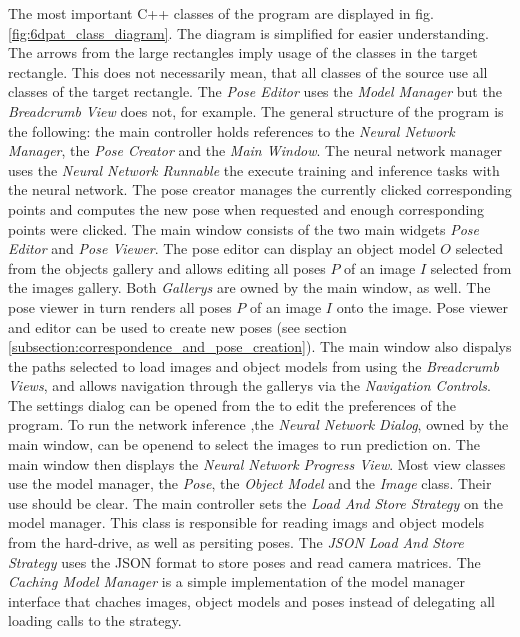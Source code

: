 The most important C++ classes of the program are displayed in fig. \ref{fig:6dpat_class_diagram}. The diagram is simplified for easier understanding. The arrows from the large rectangles imply usage of the classes in the target rectangle. This does not necessarily mean, that all classes of the source use all classes of the target rectangle. The \textit{Pose Editor} uses the \textit{Model Manager} but the \textit{Breadcrumb View} does not, for example. The general structure of the program is the following: the main controller holds references to the \textit{Neural Network Manager}, the \textit{Pose Creator} and the \textit{Main Window}. The neural network manager uses the \textit{Neural Network Runnable} the execute training and inference tasks with the neural network. The pose creator manages the currently clicked corresponding points and computes the new pose when requested and enough corresponding points were clicked. The main window consists of the two main widgets \textit{Pose Editor} and \textit{Pose Viewer}. The pose editor can display an object model $O$ selected from the objects gallery and allows editing all poses $P$ of an image $I$ selected from the images gallery. Both \textit{Gallerys} are owned by the main window, as well. The pose viewer in turn renders all poses $P$ of an image $I$ onto the image. Pose viewer and editor can be used to create new poses (see section \ref{subsection:correspondence_and_pose_creation}). The main window also dispalys the paths selected to load images and object models from using the \textit{Breadcrumb Views}, and allows navigation through the gallerys via the \textit{Navigation Controls}. The settings dialog can be opened from the to edit the preferences of the program. To run the network inference ,the \textit{Neural Network Dialog}, owned by the main window, can be openend to select the images to run prediction on. The main window then displays the \textit{Neural Network Progress View}. Most view classes use the model manager, the \textit{Pose}, the \textit{Object Model} and the \textit{Image} class. Their use should be clear. The main controller sets the \textit{Load And Store Strategy} on the model manager. This class is responsible for reading imags and object models from the hard-drive, as well as persiting poses. The \textit{JSON Load And Store Strategy} uses the JSON format to store poses and read camera matrices. The \textit{Caching Model Manager} is a simple implementation of the model manager interface that chaches images, object models and poses instead of delegating all loading calls to the strategy.

